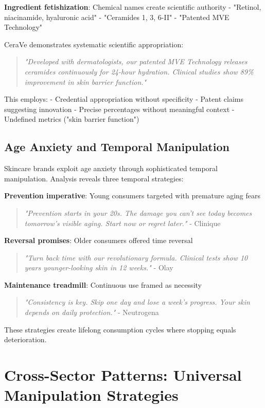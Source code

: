 \textbf{Ingredient fetishization}: Chemical names create scientific authority
- "Retinol, niacinamide, hyaluronic acid"
- "Ceramides 1, 3, 6-II"
- "Patented MVE Technology"

CeraVe demonstrates systematic scientific appropriation:

\begin{quote}
\textit{"Developed with dermatologists, our patented MVE Technology releases ceramides continuously for 24-hour hydration. Clinical studies show 89\% improvement in skin barrier function."}
\end{quote}

This employs:
- Credential appropriation without specificity
- Patent claims suggesting innovation
- Precise percentages without meaningful context
- Undefined metrics ("skin barrier function")

\subsection{Age Anxiety and Temporal Manipulation}

Skincare brands exploit age anxiety through sophisticated temporal manipulation. Analysis reveals three temporal strategies:

\textbf{Prevention imperative}: Young consumers targeted with premature aging fears
\begin{quote}
\textit{"Prevention starts in your 20s. The damage you can't see today becomes tomorrow's visible aging. Start now or regret later."} - Clinique
\end{quote}

\textbf{Reversal promises}: Older consumers offered time reversal
\begin{quote}
\textit{"Turn back time with our revolutionary formula. Clinical tests show 10 years younger-looking skin in 12 weeks."} - Olay
\end{quote}

\textbf{Maintenance treadmill}: Continuous use framed as necessity
\begin{quote}
\textit{"Consistency is key. Skip one day and lose a week's progress. Your skin depends on daily protection."} - Neutrogena
\end{quote}

These strategies create lifelong consumption cycles where stopping equals deterioration.

\section{Cross-Sector Patterns: Universal Manipulation Strategies}
\label{sec:cross_sector}

